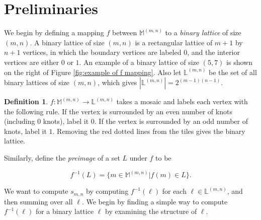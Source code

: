 \documentclass[12pt]{article}
\theoremstyle{plain}
\theoremstyle{definition}
\newtheorem{definition}{Definition}[section]
\theoremstyle{remark}
\theoremstyle{definition}
\begin{document}
\section{Preliminaries}

We begin by defining a mapping $f$ between $\mathbb{M}^{(m,n)}$ to a \textit{binary lattice} of size $(m,n)$. A binary lattice of size $(m,n)$ is a rectangular lattice of $m+1$ by $n+1$ vertices, in which the boundary vertices are labeled $0$, and the interior vertices are either $0$ or $1$. An example of a binary lattice of size $(5,7)$ is shown on the right of Figure \ref{fig:example of f mapping}. Also let $\mathbb{L}^{(m,n)}$ be the set of all binary lattices of size $(m,n)$, which gives $\left|\mathbb{L}^{(m,n)}\right| = 2^{(m-1)(n-1)}$. 

\begin{definition}

$f: \mathbb{M}^{(m,n)} \to \mathbb{L}^{(m,n)}$ takes a mosaic and labels each vertex with the following rule. If the vertex is surrounded by an even number of knots (including $0$ knots), label it $0$. If the vertex is surrounded by an odd number of knots, label it $1$. Removing the red dotted lines from the tiles gives the binary lattice. 
    
\end{definition}

Similarly, define the \textit{preimage} of a set $L$ under $f$ to be

$$f^{-1}(L) = \{m \in \mathbb{M}^{(m,n)} | f(m) \in L\}.$$

We want to compute $s_{m,n}$ by computing $f^{-1}(\ell)$ for each $\ell \in \mathbb{L}^{(m,n)}$, and then summing over all $\ell$. We begin by finding a simple way to compute $f^{-1}(\ell)$ for a binary lattice $\ell$ by examining the structure of $\ell$.
\end{document}
